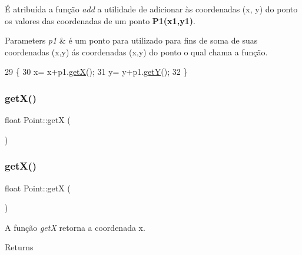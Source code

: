 É atribuída a função {\itshape add} a utilidade de adicionar às coordenadas (x, y) do ponto os valores das coordenadas de um ponto {\bfseries P1(x1,y1)}. 


\begin{DoxyParams}{Parameters}
{\em p1} & é um ponto para utilizado para fins de soma de suas coordenadas (x,y) ás coordenadas (x,y) do ponto o qual chama a função. \\
\hline
\end{DoxyParams}

\begin{DoxyCode}
29                        \{
30      x= x+p1.\hyperlink{class_point_acc27466778cc87a662bba40268c4c0c8}{getX}();
31      y= y+p1.\hyperlink{class_point_a3cccbca94719ddde353cce86ce0e2f64}{getY}();
32 \}
\end{DoxyCode}
\mbox{\label{class_point_acc27466778cc87a662bba40268c4c0c8}} 
\subsubsection{\texorpdfstring{get\+X()}{getX()}\hspace{0.1cm}{\footnotesize\ttfamily [1/2]}}
{\footnotesize\ttfamily float Point\+::getX (\begin{DoxyParamCaption}{ }\end{DoxyParamCaption})}

\mbox{\label{class_point_acc27466778cc87a662bba40268c4c0c8}} 
\subsubsection{\texorpdfstring{get\+X()}{getX()}\hspace{0.1cm}{\footnotesize\ttfamily [2/2]}}
{\footnotesize\ttfamily float Point\+::getX (\begin{DoxyParamCaption}{ }\end{DoxyParamCaption})}



A função {\itshape getX} retorna a coordenada x. 

\begin{DoxyReturn}{Returns}

\end{DoxyReturn}

